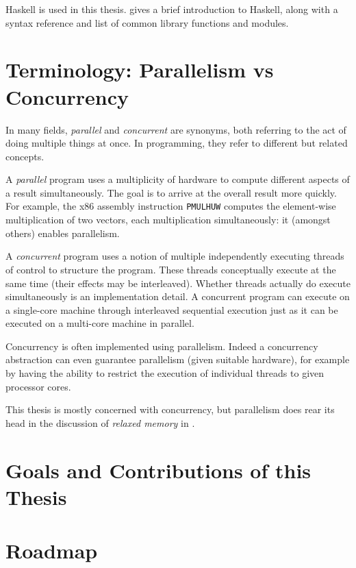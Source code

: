 \blindtext

Haskell is used in this thesis.   gives a brief introduction to
Haskell, along with a syntax reference and list of common library functions and
modules.

\section{Terminology: Parallelism vs Concurrency}
\label{sec:intro-parconc}

In many fields, \emph{parallel} and \emph{concurrent} are synonyms, both
referring to the act of doing multiple things at once.  In programming, they
refer to different but related concepts.

A \emph{parallel} program uses a multiplicity of hardware to compute different
aspects of a result simultaneously.  The goal is to arrive at the overall result
more quickly.  For example, the x86 assembly instruction \verb#PMULHUW# computes
the element-wise multiplication of two vectors, each multiplication
simultaneously: it (amongst others) enables parallelism.

A \emph{concurrent} program uses a notion of multiple independently executing
threads of control to structure the program.  These threads conceptually execute
at the same time (their effects may be interleaved).  Whether threads actually
do execute simultaneously is an implementation detail.  A concurrent program can
execute on a single-core machine through interleaved sequential execution just
as it can be executed on a multi-core machine in parallel.

Concurrency is often implemented using parallelism.  Indeed a concurrency
abstraction can even guarantee parallelism (given suitable hardware), for
example by having the ability to restrict the execution of individual threads to
given processor cores.

This thesis is mostly concerned with concurrency, but parallelism does rear its
head in the discussion of \emph{relaxed memory} in .

\section{Goals and Contributions of this Thesis}
\label{sec:intro-contributions}
\blindtext

\section{Roadmap}
\label{sec:intro-roadmap}

